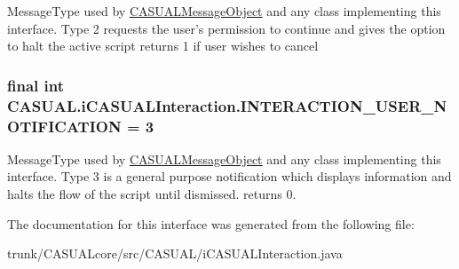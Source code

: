 Message\-Type used by \hyperlink{classCASUAL_1_1CASUALMessageObject}{C\-A\-S\-U\-A\-L\-Message\-Object} and any class implementing this interface. Type 2 requests the user's permission to continue and gives the option to halt the active script returns 1 if user wishes to cancel \hypertarget{interfaceCASUAL_1_1iCASUALInteraction_aee60fbef84821ccb93b8508720af91e9}{
\subsubsection[{I\-N\-T\-E\-R\-A\-C\-T\-I\-O\-N\-\_\-\-U\-S\-E\-R\-\_\-\-N\-O\-T\-I\-F\-I\-C\-A\-T\-I\-O\-N}]{\setlength{\rightskip}{0pt plus 5cm}final int C\-A\-S\-U\-A\-L.\-i\-C\-A\-S\-U\-A\-L\-Interaction.\-I\-N\-T\-E\-R\-A\-C\-T\-I\-O\-N\-\_\-\-U\-S\-E\-R\-\_\-\-N\-O\-T\-I\-F\-I\-C\-A\-T\-I\-O\-N = 3}}\label{interfaceCASUAL_1_1iCASUALInteraction_aee60fbef84821ccb93b8508720af91e9}
Message\-Type used by \hyperlink{classCASUAL_1_1CASUALMessageObject}{C\-A\-S\-U\-A\-L\-Message\-Object} and any class implementing this interface. Type 3 is a general purpose notification which displays information and halts the flow of the script until dismissed. returns 0. 

The documentation for this interface was generated from the following file\-:\begin{DoxyCompactItemize}
\item 
trunk/\-C\-A\-S\-U\-A\-Lcore/src/\-C\-A\-S\-U\-A\-L/i\-C\-A\-S\-U\-A\-L\-Interaction.\-java\end{DoxyCompactItemize}
